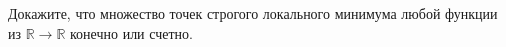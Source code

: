 Докажите, что множество точек строгого локального минимума любой функции из $\mathbb{R} \to \mathbb{R}$ конечно или счетно.